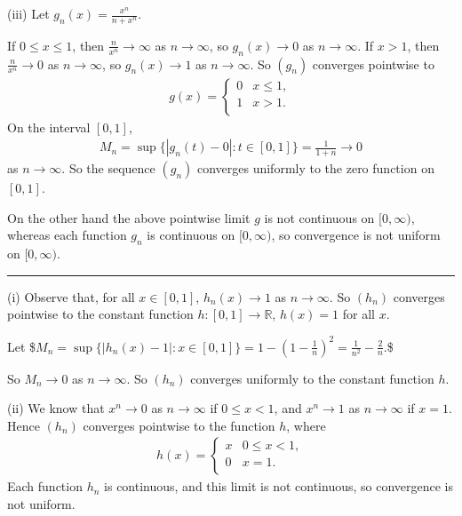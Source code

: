 \documentclass[letterpaper,10pt,english]{jupyterBook}
\begin{document}
\sphinxAtStartPar
(iii) Let \(\displaystyle g_n(x) =  \frac{x^n}{n+x^n}\).

\sphinxAtStartPar
If \(0\leq x\leq 1\), then \(\frac{n}{x^n} \rightarrow \infty\) as \(n\rightarrow \infty\), so \(g_n(x)\rightarrow 0\) as \(n\rightarrow \infty\). If \(x>1\), then \(\frac{n}{x^n} \rightarrow 0\) as \(n\rightarrow \infty\), so \(g_n(x)\rightarrow 1\) as \(n\rightarrow \infty\). So \((g_n)\) converges pointwise to
\begin{equation*}
\begin{split}
g (x) =  \left\{ \begin{array}{ll}
0 & x\leq 1, \\
1 & x>1. \\
\end{array} \right.
\end{split}
\end{equation*}
\sphinxAtStartPar
On the interval \([0,1]\),
\begin{equation*}
\begin{split}
M_n = \sup \{ |g_n(t) -0 | : t\in [0,1] \}  = \frac{1}{1+n} \rightarrow 0
\end{split}
\end{equation*}
\sphinxAtStartPar
as \(n\rightarrow \infty\). So the sequence \((g_n)\) converges uniformly to the zero function on \([0,1]\).

On the other hand the above pointwise limit \(g\) is not continuous on \([0,\infty )\), whereas each function \(g_n\) is continuous on \([0,\infty )\), so convergence is not uniform on \([0,\infty )\).


\bigskip\hrule\bigskip


\sphinxAtStartPar
{\hyperref[\detokenize{Problems:id57}]{}}
(i) Observe that, for all \(x\in[0,1]\), \(h_n(x)\rightarrow 1\) as \(n\rightarrow \infty\).
So \((h_n)\) converges pointwise to the constant function \(h:[0,1]\to\mathbb{R}\), \(h(x)=1\) for all \(x\).

\sphinxAtStartPar
Let
\$\(
M_n = \sup \{ |h_n(x)-1| : x\in [0,1] \} = 1 - \left(1-\frac{1}{n}\right)^2 =\frac{1}{n^2}-\frac{2}{n}.
\)\$

\sphinxAtStartPar
So \(M_n\rightarrow 0\) as \(n\rightarrow \infty\). So \((h_n)\) converges uniformly to the constant function \(h\).

\sphinxAtStartPar
(ii) We know that \(x^n \rightarrow 0\) as \(n\rightarrow \infty\) if \(0\leq x<1\), and \(x^n\rightarrow 1\) as \(n\rightarrow \infty\) if \(x=1\). Hence \((h_n)\) converges pointwise to the function \(h\), where
\begin{equation*}
\begin{split}
h (x) =\left\{ \begin{array}{ll}
x & 0\leq x<1, \\
0 & x=1. \\
\end{array} \right.
\end{split}
\end{equation*}
\sphinxAtStartPar
Each function \(h_n\) is continuous, and this limit is not continuous, so convergence is not uniform.
\end{document}

